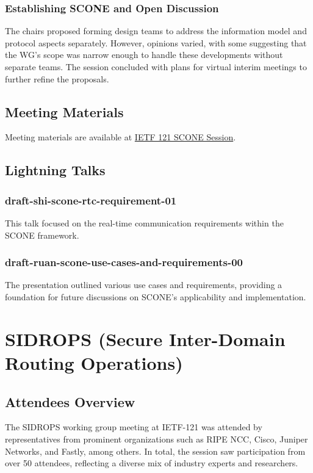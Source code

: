 \documentclass{article}
\begin{document}
\subsubsection{Establishing SCONE and Open Discussion}

The chairs proposed forming design teams to address the information model and protocol aspects separately. However, opinions varied, with some suggesting that the WG's scope was narrow enough to handle these developments without separate teams. The session concluded with plans for virtual interim meetings to further refine the proposals.

\subsection{Meeting Materials}

Meeting materials are available at \href{https://meetings.conf.meetecho.com/ietf121/?session=33576}{IETF 121 SCONE Session}.

\subsection{Lightning Talks}

\subsubsection{draft-shi-scone-rtc-requirement-01}

This talk focused on the real-time communication requirements within the SCONE framework.

\subsubsection{draft-ruan-scone-use-cases-and-requirements-00}

The presentation outlined various use cases and requirements, providing a foundation for future discussions on SCONE's applicability and implementation.




\newpage

\section{SIDROPS (Secure Inter-Domain Routing Operations)}

\subsection{Attendees Overview}
The SIDROPS working group meeting at IETF-121 was attended by representatives from prominent organizations such as RIPE NCC, Cisco, Juniper Networks, and Fastly, among others. In total, the session saw participation from over 50 attendees, reflecting a diverse mix of industry experts and researchers.
\end{document}
